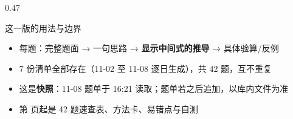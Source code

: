 \documentclass[aspectratio=169,10pt,fontset=none]{ctexbeamer}
\begin{document}
\begin{frame}[plain]
\begin{columns}[T,onlytextwidth]
    \begin{column}{0.47\textwidth}
      \begin{block}{这一版的用法与边界}
        \scriptsize
        \begin{itemize}\setlength{\itemsep}{1pt}
          \item 每题：完整题面 → 一句思路 → \textbf{显示中间式的推导} → 具体验算/反例
          \item 7 份清单全部存在（11-02 至 11-08 逐日生成），共 42 题，互不重复
          \item 这是\textbf{快照}：11-08 题单于 16:21 读取；题单若之后追加，以库内文件为准
          \item 第 \pageref{sec:answers} 页起是 42 题速查表、方法卡、易错点与自测
        \end{itemize}
      \end{block}
    \end{column}
  \end{columns}
\end{frame}
\end{document}
